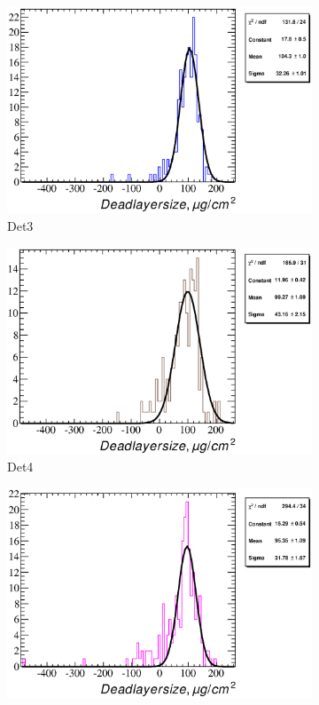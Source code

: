 \documentclass[a4paper,12pt]{article}
\begin{document}
\begin{figure}
\begin{subfigure}[b]{0.325\textwidth}
\includegraphics[width=\textwidth]{gfx/run13_alpha_study_novoltagevariation/B2D/c_hDeadLayerSize_by_run_distribution3_B2D.eps}
\caption{Det3}
\end{subfigure}
\begin{subfigure}[b]{0.325\textwidth}
\includegraphics[width=\textwidth]{gfx/run13_alpha_study_novoltagevariation/B2D/c_hDeadLayerSize_by_run_distribution4_B2D.eps}
\caption{Det4}
\end{subfigure}
\hfill
\begin{subfigure}[b]{0.325\textwidth}
\includegraphics[width=\textwidth]{gfx/run13_alpha_study_novoltagevariation/B2D/c_hDeadLayerSize_by_run_distribution5_B2D.eps}

\end{subfigure}
\end{figure}
\end{document}
